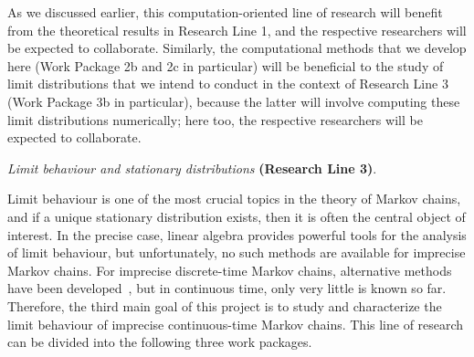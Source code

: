 \documentclass[11pt,dvipsnames,usenames,a4paper]{article}
\begin{document}
As we discussed earlier, this computation-oriented line of research will benefit from the theoretical results in Research Line 1, and the respective researchers will be expected to collaborate. Similarly, the computational methods that we develop here (Work Package 2b and 2c in particular) will be beneficial to the study of limit distributions that we intend to conduct in the context of Research Line 3 (Work Package 3b in particular), because the latter will involve computing these limit distributions numerically; here too, the respective researchers will be expected to collaborate.

\vspace{8pt}
\emph{Limit behaviour and stationary distributions} {\bf (Research Line 3)}.
\vspace{3pt}

Limit behaviour is one of the most crucial topics in the theory of Markov chains, and if a unique stationary distribution exists, then it is often the central object of interest. In the precise case, linear algebra provides powerful tools for the analysis of limit behaviour, but unfortunately, no such methods are available for imprecise Markov chains. For imprecise discrete-time Markov chains, alternative methods have been developed~\cite{cooman2008}, but in continuous time, only very little is known so far. Therefore, the third main goal of this project is to study and characterize the limit behaviour of imprecise continuous-time Markov chains. This line of research can be divided into the following three work packages.
\end{document}
